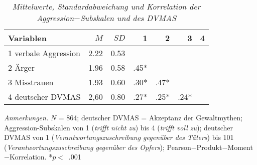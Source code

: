 \begin{table}[htb]
    \caption[Mittelwerte, Standardabweichung und Korrelation der Aggression$-$Subskalen und des DVMAS]{\textit {Mittelwerte, Standardabweichung und Korrelation der Aggression$-$Subskalen und des DVMAS}} 
    \label{lala}
    \centering
    \begin{adjustbox}{width=11cm} %
    \small
    \begin{tabular}{lrrrrrr}
      \hline
        Variablen & $M$ & $SD$ & 1 & 2 & 3 & 4 \\
       \hline
       1 verbale Aggression & 2.22 & 0.53 &      &      &      & \\
       2 Ärger              & 1.96 & 0.58 & .45* &      &      & \\
       3 Misstrauen         & 1.93 & 0.60 & .30* & .47* &      & \\
       4 deutscher DVMAS    & 2,60 & 0.80 & .27* & .25* & .24* & \\
    \end{tabular}
    \end{adjustbox}
    
    \begin{tablenotes}
        \item \textit{Anmerkungen.} \( N \) = 864; deutscher DVMAS = Akzeptanz der Gewaltmythen; Aggression-Subskalen von 1 (\textit{trifft nicht zu}) bis 4 (\textit{trifft voll zu}); deutscher DVMAS von 1 (\textit{Verantwortungszuschreibung gegenüber des Täters}) bis 101 (\textit{Verantwortungszuschreibung gegenüber des Opfers}); Pearson$-$Produkt$-$Moment$-$Korrelation. *$p<$~.001
      \end{tablenotes}
    \end{table}


